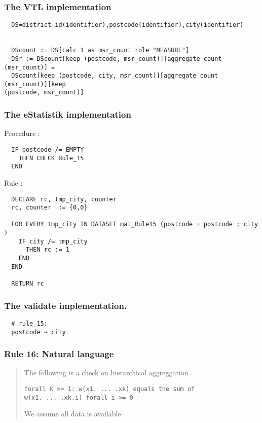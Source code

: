 \subsubsection*{The VTL implementation}
\begin{verbatim}
  DS=district-id(identifier),postcode(identifier),city(identifier)


  DScount := DS[calc 1 as msr_count role "MEASURE"]
  DSr := DScount[keep (postcode, msr_count)][aggregate count (msr_count)] =
  DScount[keep (postcode, city, msr_count)][aggregate count (msr_count)][keep
(postcode, msr_count)]
\end{verbatim}
\subsubsection*{The eStatistik implementation}
\noindent
Procedure :
\begin{verbatim}
  IF postcode /= EMPTY
    THEN CHECK Rule_15
  END
\end{verbatim}
\noindent
Rule :
\begin{verbatim}
  DECLARE rc, tmp_city, counter
  rc, counter  := {0,0}

  FOR EVERY tmp_city IN DATASET mat_Rule15 (postcode = postcode ; city )
    IF city /= tmp_city
      THEN rc := 1
    END
  END
  
  RETURN rc
\end{verbatim}

\subsubsection*{The validate implementation.}
\begin{verbatim}
  # rule_15:
  postcode ~ city
\end{verbatim}


\newpage

\subsubsection*{  Rule 16: Natural language}
\begin{quote}


The following is a check on hierarchical aggreggation.

\begin{verbatim}
forall k >= 1: w(x1. ... .xk) equals the sum of
w(x1. ... .xk.i) forall i >= 0
\end{verbatim}

We assume all data is available.



\end{quote}
